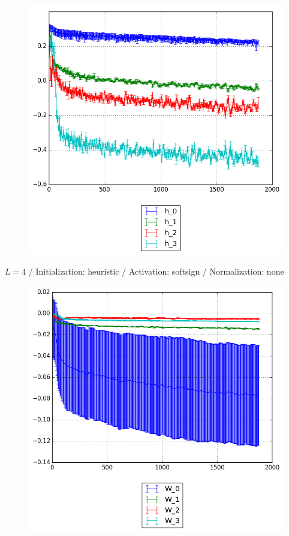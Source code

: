 \documentclass{beamer}
\begin{document}
{\begin{frame}[t]{}{}
\begin{figure}
    			\includegraphics[scale=0.4]{gfx/l4b32_softsign_heuristic_identity_cnn_activations}
    		\end{figure}
    		\vfill
	\end{frame}
	\begin{frame}[t]{}{}%
		\vfill
		\begin{center}
			{$L = 4$ / Initialization: heuristic / Activation: softsign / Normalization: none}
		\end{center}
    		\begin{figure}
    			\centering
    			\includegraphics[scale=0.4]{gfx/l4b32_softsign_heuristic_identity_cnn_weights}
    		\end{figure}
    		\vfill
	\end{frame}
	
}
\end{document}
